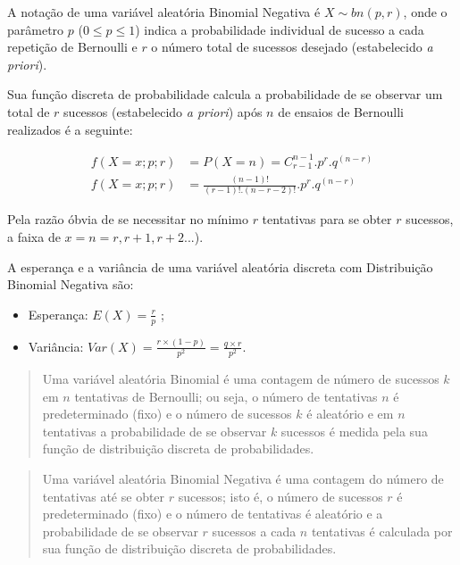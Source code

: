 \documentclass[
]{book}
\providecommand{\tightlist}{%
  \setlength{\itemsep}{0pt}\setlength{\parskip}{0pt}}
\begin{document}
\hfill\break

A notação de uma variável aleatória Binomial Negativa é \(X\sim bn(p,r)\), onde o parâmetro \(p\) (\(0 \leq p \leq1\)) indica a probabilidade individual de sucesso a cada repetição de Bernoulli e \(r\) o número total de sucessos desejado (estabelecido \emph{a priori}).

\hfill\break

Sua função discreta de probabilidade calcula a probabilidade de se observar um total de \(r\) sucessos (estabelecido \emph{a priori}) após \(n\) de ensaios de Bernoulli realizados é a seguinte:

\begin{align*}
f(X=x; p; r) & = P(X=n) = {C}_{r-1}^{n-1} . {p}^{r} . {q}^{(n-r)} \\
f(X=x; p; r) & = \frac{(n-1)!}{ (r-1)!. (n-r-2)!} . {p}^{r}. {q}^{(n-r)}
\end{align*}

Pela razão óbvia de se necessitar no mínimo \(r\) tentativas para se obter \(r\) sucessos, a faixa de \(x=n={r, r+1, r+2 ...}\)).

\hfill\break

A esperança e a variância de uma variável aleatória discreta com Distribuição Binomial Negativa são:

\begin{itemize}
\tightlist
\item
  Esperança: \(E(X) = \frac{r}{p}\) ;\\
\item
  Variância: \(Var(X) = \frac{r \times (1-p)}{p^{2}} = \frac{q \times r}{p^{2}}\).
\end{itemize}

\hfill\break

\begin{quote}
Uma variável aleatória Binomial é uma contagem de número de sucessos \(k\) em \(n\) tentativas de Bernoulli; ou seja, o número de tentativas \(n\) é predeterminado (fixo) e o número de sucessos \(k\) é aleatório e em \(n\) tentativas a probabilidade de se observar \(k\) sucessos é medida pela sua função de distribuição discreta de probabilidades.
\end{quote}

\begin{quote}
Uma variável aleatória Binomial Negativa é uma contagem do número de tentativas até se obter \(r\) sucessos; isto é, o número de sucessos \(r\) é predeterminado (fixo) e o número de tentativas é aleatório e a probabilidade de se observar \(r\) sucessos a cada \(n\) tentativas é calculada por sua função de distribuição discreta de probabilidades.
\end{quote}
\end{document}

